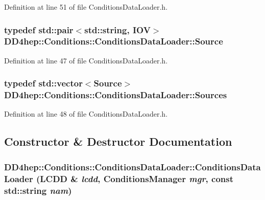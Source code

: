 Definition at line 51 of file ConditionsDataLoader.h.\hypertarget{class_d_d4hep_1_1_conditions_1_1_conditions_data_loader_acad32659f22e37a422ec6abdb4f95b3e}{
\subsubsection[{Source}]{\setlength{\rightskip}{0pt plus 5cm}typedef std::pair$<$std::string, {\bf IOV}$>$ {\bf DD4hep::Conditions::ConditionsDataLoader::Source}}}
\label{class_d_d4hep_1_1_conditions_1_1_conditions_data_loader_acad32659f22e37a422ec6abdb4f95b3e}


Definition at line 47 of file ConditionsDataLoader.h.\hypertarget{class_d_d4hep_1_1_conditions_1_1_conditions_data_loader_a10469a47fdf0b7949194f79c35ee9510}{
\subsubsection[{Sources}]{\setlength{\rightskip}{0pt plus 5cm}typedef std::vector$<${\bf Source}$>$ {\bf DD4hep::Conditions::ConditionsDataLoader::Sources}}}
\label{class_d_d4hep_1_1_conditions_1_1_conditions_data_loader_a10469a47fdf0b7949194f79c35ee9510}


Definition at line 48 of file ConditionsDataLoader.h.

\subsection{Constructor \& Destructor Documentation}
\hypertarget{class_d_d4hep_1_1_conditions_1_1_conditions_data_loader_a1d230a1e812648ae74e0857b279971e3}{
\subsubsection[{ConditionsDataLoader}]{\setlength{\rightskip}{0pt plus 5cm}DD4hep::Conditions::ConditionsDataLoader::ConditionsDataLoader (LCDD \& {\em lcdd}, \/  {\bf ConditionsManager} {\em mgr}, \/  const std::string {\em nam})}}
\label{class_d_d4hep_1_1_conditions_1_1_conditions_data_loader_a1d230a1e812648ae74e0857b279971e3}


